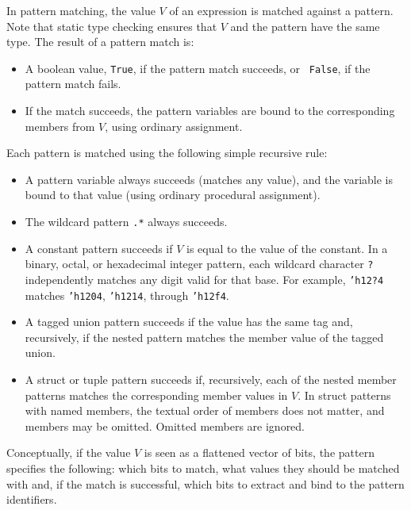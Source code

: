 \documentclass[twoside,letterpaper]{article}
\newcommand{\te}[1]{\texttt{#1}}
\begin{document}
In pattern matching, the value $V$ of an expression is matched against
a pattern.  Note that static type checking ensures that $V$ and the
pattern have the same type.  The result of a pattern match is:
\begin{itemize}

\item
A boolean value, \texttt{True}, if the pattern match succeeds, or {\tt
False}, if the pattern match fails.

\item If the match succeeds, the pattern variables are bound to the
corresponding members from $V$, using ordinary assignment.

\end{itemize}
Each pattern is matched using the following simple recursive rule:
\begin{itemize}
\item
A pattern variable always succeeds (matches any value), and the
variable is bound to that value (using ordinary procedural
assignment).

\item
The wildcard pattern \texttt{.*} always succeeds.

\item
A constant pattern succeeds if $V$ is equal to the value of the
constant.  In a binary, octal, or hexadecimal integer pattern, each
wildcard character \te{?} independently matches any digit valid for
that base.  For example, \te{'h12?4} matches
\te{'h1204}, \te{'h1214}, through \te{'h12f4}.

\item
A tagged union pattern succeeds if the value has the same tag and,
recursively, if the nested pattern matches the member value of the
tagged union.

\item
A struct or tuple pattern succeeds if, recursively, each of the nested
member patterns matches the corresponding member values in $V$.  In
struct patterns with named members, the textual order of members does
not matter, and members may be omitted.  Omitted members are ignored.

\end{itemize}
Conceptually, if the value $V$ is seen as a flattened vector of bits,
the pattern specifies the following: which bits to match, what values
they should be matched with and, if the match is successful, which
bits to extract and bind to the pattern identifiers.

\end{document}
